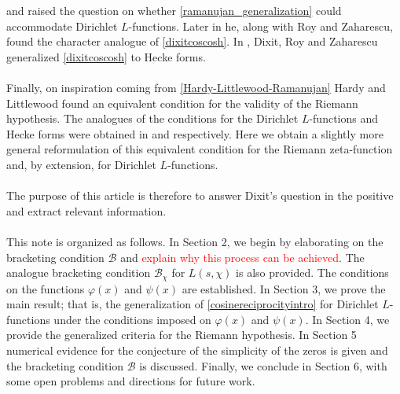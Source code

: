 \documentclass[11pt]{article}
\numberwithin{equation}{section}		 			%
\numberwithin{figure}{section}			 			%
\begin{document}
and raised the question on whether \eqref{ramanujan_generalization} could accommodate Dirichlet $L$-functions. Later in \cite{dixit_3} he, along with Roy and Zaharescu, found the character analogue of \eqref{dixitcoscosh}. In \cite{dixit_4}, Dixit, Roy and Zaharescu generalized \eqref{dixitcoscosh} to Hecke forms.\\\\
Finally, on inspiration coming from \eqref{Hardy-Littlewood-Ramanujan} Hardy and Littlewood \cite{hardy_littlewood} found an equivalent condition for the validity of the Riemann hypothesis. The analogues of the conditions for the Dirichlet $L$-functions and Hecke forms were obtained in \cite{dixit_3} and \cite{dixit_4} respectively. Here we obtain a slightly more general reformulation of this equivalent condition for the Riemann zeta-function and, by extension, for Dirichlet $L$-functions.\\\\
The purpose of this article is therefore to answer Dixit's question in the positive and extract relevant information.\\\\
This note is organized as follows. In Section 2, we begin by elaborating on the bracketing condition $\mathcal{B}$ and \textcolor{red}{explain why this process can be achieved}. The analogue bracketing condition $\mathcal{B}_\chi$ for $L(s,\chi)$ is also provided. The conditions on the functions $\varphi(x)$ and $\psi(x)$ are established. In Section 3, we prove the main result; that is, the generalization of \eqref{cosinereciprocityintro} for Dirichlet $L$-functions under the conditions imposed on $\varphi(x)$ and $\psi(x)$. In Section 4, we provide the generalized criteria for the Riemann hypothesis. In Section 5 numerical evidence for the conjecture of the simplicity of the zeros is given and the bracketing condition $\mathcal{B}$ is discussed. Finally, we conclude in Section 6, with some open problems and directions for future work.
\end{document}
